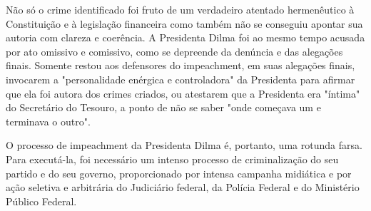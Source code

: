 Não só o crime identificado foi fruto de um verdadeiro atentado
hermenêutico à Constituição e à legislação financeira como também não se
conseguiu apontar sua autoria com clareza e coerência. A Presidenta
Dilma foi ao mesmo tempo acusada por ato omissivo e comissivo, como se
depreende da denúncia e das alegações finais. Somente restou aos
defensores do impeachment, em suas alegações finais, invocarem a
"personalidade enérgica e controladora" da Presidenta para afirmar que
ela foi autora dos crimes criados, ou atestarem que a Presidenta era
"íntima" do Secretário do Tesouro, a ponto de não se saber "onde
começava um e terminava o outro".

O processo de impeachment da Presidenta Dilma é, portanto, uma rotunda
farsa. Para executá-la, foi necessário um intenso processo de
criminalização do seu partido e do seu governo, proporcionado por
intensa campanha midiática e por ação seletiva e arbitrária do
Judiciário federal, da Polícia Federal e do Ministério Público Federal.

